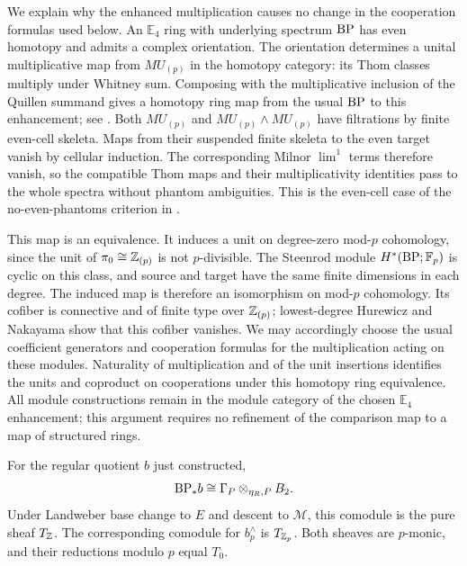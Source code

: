 We explain why the enhanced multiplication causes no change in the
cooperation formulas used below. An $\mathbb E_4$ ring with underlying
spectrum $\mathrm{BP}$ has even homotopy and admits a complex orientation.
The orientation determines a unital multiplicative map from
$MU_{(p)}$ in the homotopy category: its Thom classes multiply under
Whitney sum. Composing with the multiplicative inclusion of the Quillen
summand gives a homotopy ring map from the usual $\mathrm{BP}$ to this
enhancement; see \cite[Theorem~4.1.12 and Lemma~4.1.13]{Ravenel1986}.
Both $MU_{(p)}$ and $MU_{(p)}\wedge MU_{(p)}$ have filtrations by
finite even-cell skeleta. Maps from their suspended finite skeleta to
the even target vanish by cellular induction. The corresponding Milnor
$\lim^1$ terms therefore vanish, so the compatible Thom maps and their
multiplicativity identities pass to the whole spectra without phantom
ambiguities.
This is the even-cell case of the no-even-phantoms criterion in
\cite[Lemma~2.11, Corollary~2.15, and Proposition~2.18]{HoveyStrickland1999}.

This map is an equivalence. It induces a unit on degree-zero mod-$p$
cohomology, since the unit of $\pi_0\cong\mathbb Z_{(p)}$ is not
$p$-divisible. The Steenrod module $H^*(\mathrm{BP};\mathbb F_p)$ is cyclic on this
class, and source and target have the same finite dimensions in each
degree. The induced map is therefore an isomorphism on mod-$p$
cohomology. Its cofiber is connective and of finite type over
$\mathbb Z_{(p)}$; lowest-degree Hurewicz and Nakayama show that this cofiber
vanishes. We may accordingly choose the usual coefficient generators
and cooperation formulas for the multiplication acting on these modules.
Naturality of multiplication and of the unit insertions identifies the
units and coproduct on cooperations under this homotopy ring equivalence.
All module constructions remain in the module category of the chosen
$\mathbb E_4$ enhancement; this argument requires no refinement of the
comparison map to a map of structured rings.

\begin{proposition}
\label{comp:bp-comodule}
For the regular quotient $b$ just constructed,
\[
 \mathrm{BP}_*b\cong\Gamma_P\otimes_{\eta_R,P}B_2.
\]
Under Landweber base change to $E$ and descent to $\mathcal M$, this
comodule is the pure sheaf $T_{\mathbb Z}$. The corresponding comodule for
$b_p^\wedge$ is $T_{\mathbb Z_p}$. Both sheaves are $p$-monic, and their
reductions modulo $p$ equal $T_0$.
\end{proposition}

